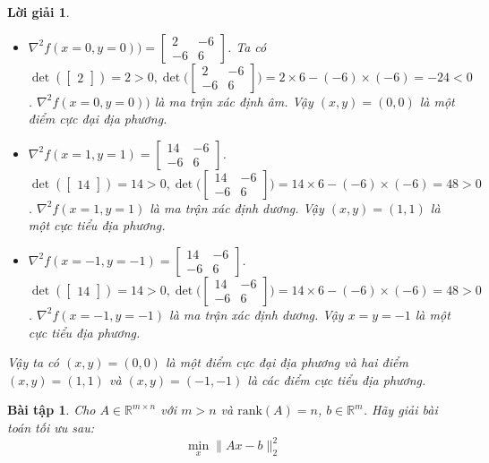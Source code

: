 \documentclass[14pt, a4paper]{article}
\theoremstyle{sltheorem}
\newtheorem{baitap}{Bài tập}
\theoremstyle{soltheorem}
\newtheorem*{loigiai}{Lời giải}
\begin{document}
\begin{loigiai}
        \begin{itemize}
            \item $\nabla^2 f(x=0,y=0))=\begin{bmatrix} 2 & -6 \\ -6 & 6 \end{bmatrix}$. Ta có $\det(\begin{bmatrix}2\end{bmatrix})=2>0, \det{\Big(\begin{bmatrix} 2 & -6 \\ -6 & 6 \end{bmatrix}\Big)}=2\times6 - (-6)\times(-6)=-24<0$. $\nabla^2 f(x=0,y=0))$ là ma trận xác định âm. Vậy $(x,y)=(0,0)$ là một điểm cực đại địa phương.
            \item $\nabla^2 f(x=1,y=1)=\begin{bmatrix} 14 & -6 \\ -6 & 6 \end{bmatrix}$. $\det{(\begin{bmatrix}14\end{bmatrix})}=14>0, \det{\Big(\begin{bmatrix} 14 & -6 \\ -6 & 6 \end{bmatrix}\Big)}=14\times6 - (-6)\times(-6)=48>0$. $\nabla^2 f(x=1,y=1)$ là ma trận xác định dương. Vậy $(x,y)=(1,1)$ là một cực tiểu địa phương.
            \item $\nabla^2 f(x=-1,y=-1)=\begin{bmatrix} 14 & -6 \\ -6 & 6 \end{bmatrix}$. $\det{(\begin{bmatrix}14\end{bmatrix})}=14>0, \det{\Big(\begin{bmatrix} 14 & -6 \\ -6 & 6 \end{bmatrix}\Big)}=14\times6 - (-6)\times(-6)=48>0$. $\nabla^2 f(x=-1,y=-1)$ là ma trận xác định dương. Vậy $x=y=-1$ là một cực tiểu địa phương.
        \end{itemize}
        Vậy ta có $(x,y)=(0,0)$ là một điểm cực đại địa phương và hai điểm $(x,y)=(1, 1)$ và $(x,y)=(-1,-1)$ là các điểm cực tiểu địa phương.
    \end{loigiai}

    \begin{baitap}
        Cho $A \in \mathbb{R}^{m \times n}$ với $m > n$ và $\mathrm{rank}(A)=n$, $b \in \mathbb{R}^{m}$. Hãy giải bài toán tối ưu sau:
        \begin{equation*}
            \min_x \lVert Ax - b \rVert_2^2
        \end{equation*}
    \end{baitap}
\end{document}
